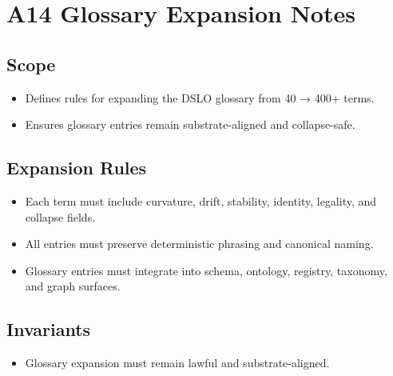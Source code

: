 \section{A14 Glossary Expansion Notes}

\subsection{Scope}
\begin{itemize}
    \item Defines rules for expanding the DSLO glossary from 40 → 400+ terms.
    \item Ensures glossary entries remain substrate-aligned and collapse-safe.
\end{itemize}

\subsection{Expansion Rules}
\begin{itemize}
    \item Each term must include curvature, drift, stability, identity, legality, and collapse fields.
    \item All entries must preserve deterministic phrasing and canonical naming.
    \item Glossary entries must integrate into schema, ontology, registry, taxonomy, and graph surfaces.
\end{itemize}

\subsection{Invariants}
\begin{itemize}
    \item Glossary expansion must remain lawful and substrate-aligned.
\end{itemize}
